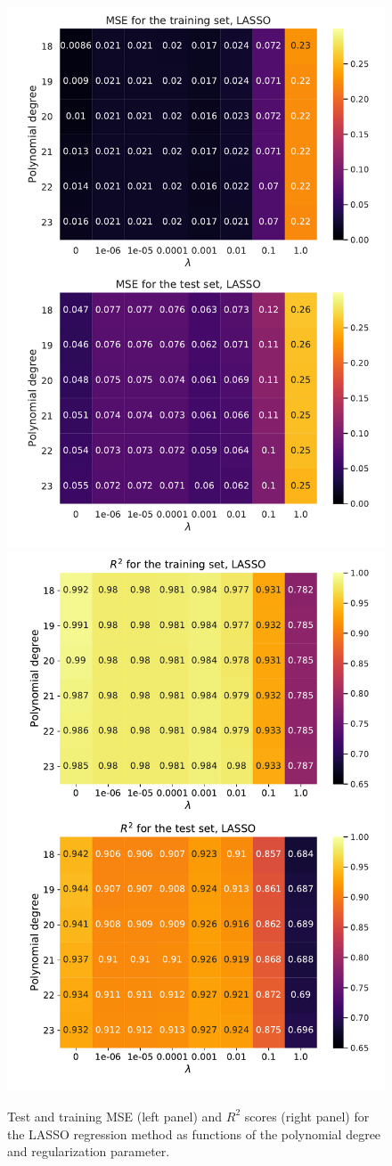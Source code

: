 \documentclass[numberedappendix, twocolappendix]{emulateapj}
\begin{document}
\begin{figure}[!htb]
    \centering
    \includegraphics[width=.49\textwidth]{Figures/LASSO_MSE.pdf}
    \includegraphics[width=.49\textwidth]{Figures/LASSO_R2.pdf}
    \caption{Test and training MSE (left panel) and $R^2$ scores (right panel) for the LASSO regression method as functions of the polynomial degree and regularization parameter.}
    \label{fig: LASSO Score}
\end{figure}
\end{document}
